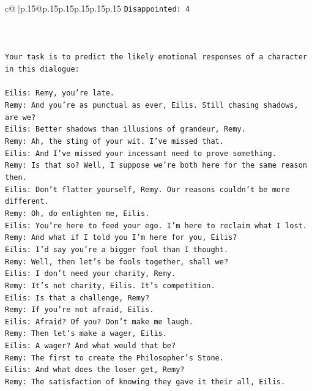 \documentclass{article}
\begin{document}
{\begin{supertabular}{c@{$\;$}|p{.15\linewidth}@{}p{.15\linewidth}p{.15\linewidth}p{.15\linewidth}p{.15\linewidth}p{.15\linewidth}}
{{{\texttt{Disappointed: 4} \\
\\ 
\\ 
\\ 
\texttt{Your task is to predict the likely emotional responses of a character in this dialogue:} \\
\\ 
\texttt{Eilis: Remy, you're late.} \\
\texttt{Remy: And you're as punctual as ever, Eilis. Still chasing shadows, are we?} \\
\texttt{Eilis: Better shadows than illusions of grandeur, Remy.} \\
\texttt{Remy: Ah, the sting of your wit. I've missed that. } \\
\texttt{Eilis: And I've missed your incessant need to prove something.} \\
\texttt{Remy: Is that so? Well, I suppose we're both here for the same reason then.} \\
\texttt{Eilis: Don't flatter yourself, Remy. Our reasons couldn't be more different.} \\
\texttt{Remy: Oh, do enlighten me, Eilis. } \\
\texttt{Eilis: You're here to feed your ego. I'm here to reclaim what I lost.} \\
\texttt{Remy: And what if I told you I'm here for you, Eilis?} \\
\texttt{Eilis: I'd say you're a bigger fool than I thought.} \\
\texttt{Remy: Well, then let's be fools together, shall we? } \\
\texttt{Eilis: I don't need your charity, Remy.} \\
\texttt{Remy: It's not charity, Eilis. It's competition. } \\
\texttt{Eilis: Is that a challenge, Remy?} \\
\texttt{Remy: If you're not afraid, Eilis.} \\
\texttt{Eilis: Afraid? Of you? Don't make me laugh.} \\
\texttt{Remy: Then let's make a wager, Eilis. } \\
\texttt{Eilis: A wager? And what would that be?} \\
\texttt{Remy: The first to create the Philosopher's Stone.} \\
\texttt{Eilis: And what does the loser get, Remy?} \\
\texttt{Remy: The satisfaction of knowing they gave it their all, Eilis.} \\
}}}
\end{supertabular}}
\end{document}
